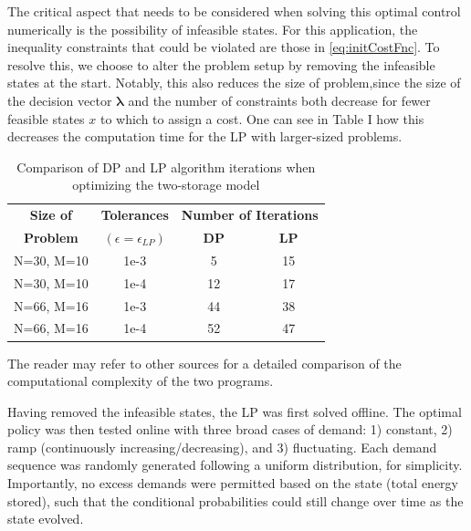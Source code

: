 \documentclass[conference]{IEEEtran}
\begin{document}
The critical aspect that needs to be considered when solving this optimal control numerically is the possibility of infeasible states. For this application, the inequality constraints that could be violated are those in \eqref{eq:initCostFnc}. To resolve this, we choose to alter the problem setup by removing the infeasible states at the start. Notably, this also reduces the size of problem,since the size of the decision vector $\boldsymbol{\lambda}$ and the number of constraints both decrease for fewer feasible states $x$ to which to assign a cost. One can see in Table I how this decreases the computation time for the LP with larger-sized problems.

\begin{table}[htbp]
	\begin{center}
		\begin{tabular}{|c|c|c|c|}
			\hline
			\textbf{Size of}&\textbf{Tolerances}&\multicolumn{2}{|c|}{\textbf{Number of Iterations}} \\
			\cline{3-4} 
			\textbf{Problem} & \textbf{$(\epsilon=\epsilon_{LP})$} & \textbf{DP} &  \textbf{LP} \\
			\hline
			N=30, M=10& 1e-3 & 5 & 15 \\
			\hline
			N=30, M=10& 1e-4 & 12 & 17 \\
			\hline
			N=66, M=16& 1e-3 & 44 & 38 \\
			\hline
			N=66, M=16& 1e-4 & 52 & 47 \\
			\hline
		\end{tabular}
	\end{center}
	\label{tab:LPvsDP_Iterations}
	\caption{Comparison of DP and LP algorithm iterations when optimizing the two-storage model}
\end{table} The reader may refer to other sources for a detailed comparison of the computational complexity of the two programs.

Having removed the infeasible states, the LP was first solved offline. The optimal policy was then tested online with three broad cases of demand: 1) constant, 2) ramp (continuously increasing/decreasing), and 3) fluctuating. Each demand sequence was randomly generated following a uniform distribution, for simplicity. Importantly, no excess demands were permitted based on the state (total energy stored), such that the conditional probabilities could still change over time as the state evolved.
\end{document}
